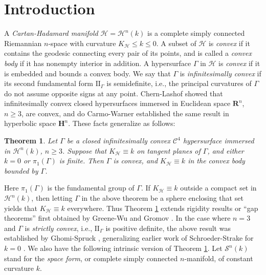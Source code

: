 \documentclass[11pt]{amsart}
\newtheorem{theorem}{Theorem}[section]
\theoremstyle{definition}
\newcommand{\R}{\mathbf{R}}
\newcommand{\C}{\mathcal{C}}
\newcommand{\ff}{\mathrm{I\!I}}
\begin{document}
\section{Introduction}
A \emph{Cartan-Hadamard manifold} $\mathcal{H}=\mathcal{H}^n(k)$ is a complete simply connected Riemannian $n$-space with curvature $K_{\mathcal{H}}\leq k\leq 0$. A subset of $\mathcal{H}$ is \emph{convex} if it contains the geodesic connecting every pair of its points, and is called a \emph{convex body} if it has nonempty interior in addition.  A hypersurface $\Gamma$  in $\mathcal{H}$ is \emph{convex} if it is embedded and bounds a convex body. We say that  $\Gamma$  is \emph{infinitesimally convex} if its second fundamental form $\ff_\Gamma$ is  semidefinite, i.e., the principal curvatures of $\Gamma$ do not assume opposite signs at any point. Chern-Lashof \cite{chern-lashof:tight1, chern-lashof:tight2} showed that infinitesimally convex closed hypersurfaces immersed in Euclidean space $\R^n$, $n\geq 3$, are convex, and do Carmo-Warner \cite{docarmo&warner} established the same result in hyperbolic space $\mathbf{H}^n$. These facts generalize as follows:

\begin{theorem}\label{thm:main}
Let $\Gamma$ be a closed  infinitesimally convex $\C^4$  hypersurface immersed in $\mathcal{H}^n(k)$, $n\geq 3$. Suppose that $K_{\mathcal{H}}\equiv k$ on  tangent planes of $\Gamma$, and either $k=0$ or $\pi_1(\Gamma)$ is finite. Then $\Gamma$  is convex, and $K_{\mathcal{H}}\equiv k$ in the convex body bounded by $\Gamma$.
\end{theorem}

Here $\pi_1(\Gamma)$ is the fundamental group of $
\Gamma$. If $K_\mathcal{H}\equiv k$ outside a compact set  in $\mathcal{H}^n(k)$, then letting $\Gamma$ in the above theorem be a sphere enclosing that set yields that $K_\mathcal{H}\equiv k$ everywhere. Thus Theorem \ref{thm:main} extends rigidity results or ``gap theorems'' \cite{seshadri2009} first obtained by Greene-Wu \cite{greene-wu1982} and Gromov \cite[Sec. 5]{ballmann-gromov-schroeder}. 
In the case where $n=3$ and $\Gamma$ is \emph{strictly convex}, i.e., $\mathrm{I\!I}_\Gamma$ is positive definite, the above result 
was established  by Ghomi-Spruck \cite{ghomi-spruck-rigidity}, generalizing earlier work of Schroeder-Strake for $k=0$ \cite{schroeder-strake1989a}. We also have the following intrinsic version of Theorem \ref{thm:main}. Let $\mathcal{S}^n(k)$ stand for the \emph{space form}, or complete simply connected $n$-manifold, of constant curvature $k$.
\end{document}
